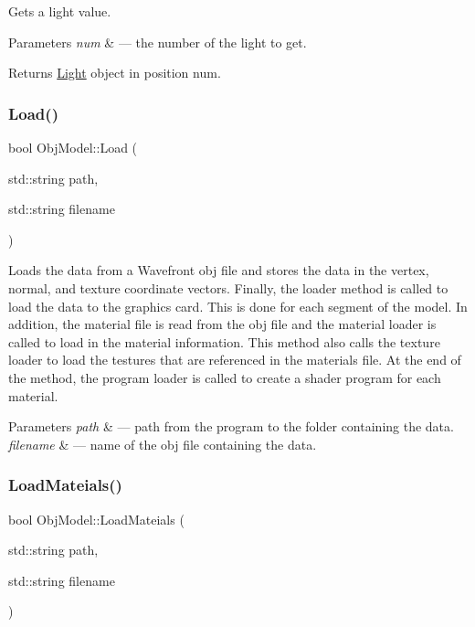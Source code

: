 Gets a light value. 


\begin{DoxyParams}{Parameters}
{\em num} & --- the number of the light to get.\\
\hline
\end{DoxyParams}
\begin{DoxyReturn}{Returns}
\hyperlink{class_light}{Light} object in position num. 
\end{DoxyReturn}
\mbox{\label{class_obj_model_a3aa8527dfa60ff71adb8a11833c164a5}} 
\subsubsection{\texorpdfstring{Load()}{Load()}}
{\footnotesize\ttfamily bool Obj\+Model\+::\+Load (\begin{DoxyParamCaption}\item[{std\+::string}]{path,  }\item[{std\+::string}]{filename }\end{DoxyParamCaption})}



Loads the data from a Wavefront obj file and stores the data in the vertex, normal, and texture coordinate vectors. Finally, the loader method is called to load the data to the graphics card. This is done for each segment of the model. In addition, the material file is read from the obj file and the material loader is called to load in the material information. This method also calls the texture loader to load the testures that are referenced in the materials file. At the end of the method, the program loader is called to create a shader program for each material. 


\begin{DoxyParams}{Parameters}
{\em path} & --- path from the program to the folder containing the data.\\
\hline
{\em filename} & --- name of the obj file containing the data. \\
\hline
\end{DoxyParams}
\mbox{\label{class_obj_model_ac67e39ccdee938c1666f1d20542fd1d0}} 
\subsubsection{\texorpdfstring{Load\+Mateials()}{LoadMateials()}}
{\footnotesize\ttfamily bool Obj\+Model\+::\+Load\+Mateials (\begin{DoxyParamCaption}\item[{std\+::string}]{path,  }\item[{std\+::string}]{filename }\end{DoxyParamCaption})}



